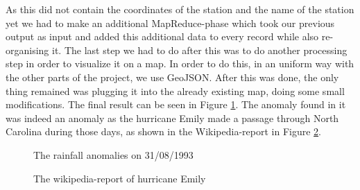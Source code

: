 As this did not contain the coordinates of the station and the name of the station yet we had to make an additional MapReduce-phase which took our previous output as input and added this additional data to every record while also re-organising it. The last step we had to do after this was to do another processing step in order to visualize it on a map. In order to do this, in an uniform way with the other parts of the project, we use GeoJSON. After this was done, the only thing remained was plugging it into the already existing map, doing some small modifications. The final result can be seen in Figure \ref{fig:rainfall1}. The anomaly found in it was indeed an anomaly as the hurricane Emily made a passage through North Carolina during those days, as shown in the Wikipedia-report in Figure \ref{fig:rainfall2}.
\begin{figure}[ht]
\centering
{}
\caption{The rainfall anomalies on 31/08/1993}
\label{fig:rainfall1}
\end{figure}
\begin{figure}[ht]
\centering
{}
\caption{The wikipedia-report of hurricane Emily}
\label{fig:rainfall2}
\end{figure}
